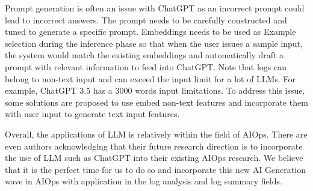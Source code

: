 \documentclass[conference]{IEEEtran}
\begin{document}
Prompt generation is often an issue with ChatGPT as an incorrect prompt could lead to incorrect answers. The prompt needs to be carefully constructed and tuned to generate a specific prompt. Embeddings needs to be used as Example selection during the inference phase so that when the user issues a sample input, the system would match the existing embeddings and automatically draft a prompt with relevant information to feed into ChatGPT. Note that logs can belong to non-text input and can exceed the input limit for a lot of LLMs. For example, ChatGPT 3.5 has a 3000 words input limitations. To address this issue, some solutions are proposed to use embed non-text features and incorporate them with user input to generate text input features. \cite{Source https://dbgroup.cs.tsinghua.edu.cn/ligl/papers/dbgpt-dse.pdf}

Overall, the applications of LLM is relatively within the field of AIOps. There are even authors acknowledging that their future research direction is to incorporate the use of LLM such as ChatGPT into their existing AIOps research. \cite{Souce https://browse.arxiv.org/pdf/2308.11225.pdf} We believe that it is the perfect time for us to do so and incorporate this new AI Generation wave in AIOps with application in the log analysis and log summary fields.








\vspace{12pt}
\end{document}
